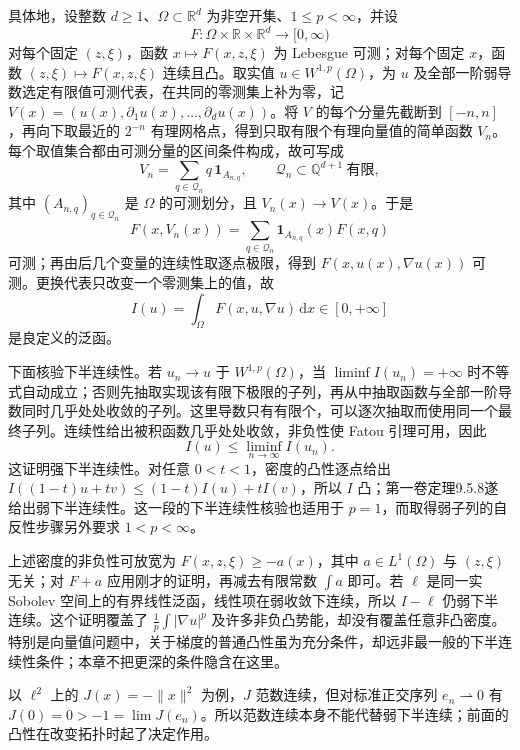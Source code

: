 具体地，设整数 \(d\geq1\)、\(\Omega\subset\mathbb R^d\) 为非空开集、\(1\leq p<\infty\)，并设
\[
 F:\Omega\times\mathbb R\times\mathbb R^d\longrightarrow[0,\infty)
\]
对每个固定 \((z,\xi)\)，函数 \(x\mapsto F(x,z,\xi)\) 为 Lebesgue 可测；对每个固定 \(x\)，函数 \((z,\xi)\mapsto F(x,z,\xi)\) 连续且凸。取实值 \(u\in W^{1,p}(\Omega)\)，为 \(u\) 及全部一阶弱导数选定有限值可测代表，在共同的零测集上补为零，记
\(V(x)=(u(x),\partial_1u(x),\ldots,\partial_du(x))\)。将 \(V\) 的每个分量先截断到 \([-n,n]\)，再向下取最近的 \(2^{-n}\) 有理网格点，得到只取有限个有理向量值的简单函数 \(V_n\)。每个取值集合都由可测分量的区间条件构成，故可写成
\[
 V_n=\sum_{q\in\mathcal Q_n}q\,\mathbf1_{A_{n,q}},\qquad
 \mathcal Q_n\subset\mathbb Q^{d+1}\ \text{有限},
\]
其中 \((A_{n,q})_{q\in\mathcal Q_n}\) 是 \(\Omega\) 的可测划分，且 \(V_n(x)\to V(x)\)。于是
\[
 F(x,V_n(x))=\sum_{q\in\mathcal Q_n}
                  \mathbf1_{A_{n,q}}(x)F(x,q)
\]
可测；再由后几个变量的连续性取逐点极限，得到 \(F(x,u(x),\nabla u(x))\) 可测。更换代表只改变一个零测集上的值，故
\[
 I(u)=\int_\Omega F(x,u,\nabla u)\,\mathrm dx\in[0,+\infty]
\]
是良定义的泛函。

\ProseParagraphBreak

下面核验下半连续性。若 \(u_n\to u\) 于 \(W^{1,p}(\Omega)\)，当 \(\liminf I(u_n)=+\infty\) 时不等式自动成立；否则先抽取实现该有限下极限的子列，再从中抽取函数与全部一阶导数同时几乎处处收敛的子列。这里导数只有有限个，可以逐次抽取而使用同一个最终子列。连续性给出被积函数几乎处处收敛，非负性使 Fatou 引理可用，因此
\[
 I(u)\leq\liminf_{n\to\infty}I(u_n).
\]
这证明强下半连续性。对任意 \(0<t<1\)，密度的凸性逐点给出
\(I((1-t)u+tv)\leq(1-t)I(u)+tI(v)\)，所以 \(I\) 凸；第一卷定理9.5.8遂给出弱下半连续性。这一段的下半连续性核验也适用于 \(p=1\)，而取得弱子列的自反性步骤另外要求 \(1<p<\infty\)。

\ProseParagraphBreak

上述密度的非负性可放宽为 \(F(x,z,\xi)\geq-a(x)\)，其中 \(a\in L^1(\Omega)\) 与 \((z,\xi)\) 无关；对 \(F+a\) 应用刚才的证明，再减去有限常数 \(\int a\) 即可。若 \(\ell\) 是同一实 Sobolev 空间上的有界线性泛函，线性项在弱收敛下连续，所以 \(I-\ell\) 仍弱下半连续。这个证明覆盖了 \(\tfrac1p\int|\nabla u|^p\) 及许多非负凸势能，却没有覆盖任意非凸密度。特别是向量值问题中，关于梯度的普通凸性虽为充分条件，却远非最一般的下半连续性条件；本章不把更深的条件隐含在这里。

\ProseParagraphBreak

以 \(\ell^2\) 上的 \(J(x)=-\lVert x\rVert^2\) 为例，\(J\) 范数连续，但对标准正交序列 \(e_n\rightharpoonup0\) 有 \(J(0)=0>-1=\lim J(e_n)\)。所以范数连续本身不能代替弱下半连续；前面的凸性在改变拓扑时起了决定作用。

